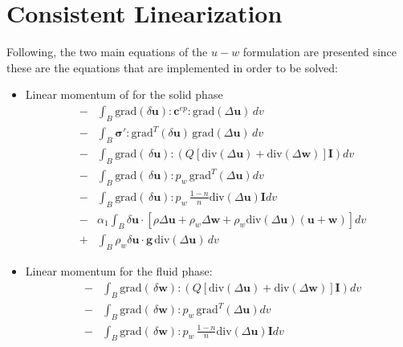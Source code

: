 \documentclass[preprint,12pt,a4paper]{elsarticle}
\begin{document}
\section{Consistent Linearization}
\label{ap:2}
Following, the two main equations of the $u-w$ formulation are presented since these are the equations that are implemented in order to be solved:

\begin{itemize}
\item Linear momentum of for the solid phase
\begin{eqnarray} \label{eq_r1}
&-& \int_B \mbox{grad}(\delta\boldsymbol{u}):\boldsymbol{c}^{ep}:\mbox{grad}(\Delta\boldsymbol{u}) \, dv 
\nonumber \\
&-& \int_B \boldsymbol{ \sigma'}:\mbox{grad}^T(\delta\boldsymbol{u} )\, \mbox{grad}(\Delta\boldsymbol{u}) \, dv 
\nonumber \\
&-& \int_B 
\mbox{grad}(\, \delta\boldsymbol{u}) :\left(Q\left[
\mbox{div}(\Delta\boldsymbol{ u})+
\mbox{div}(\Delta\boldsymbol{w}) \right] \boldsymbol{I}\right) dv
\nonumber \\
&-& \int_B 
\mbox{grad}(\, \delta\boldsymbol{u}) : p_w \, \mbox{grad}^T(\Delta\boldsymbol{u}) dv
\nonumber \\
&-& \int_B \mbox{grad}(\, \delta\boldsymbol{u}) : p_w \,\frac{1-n}{n}\mbox{div}(\Delta\boldsymbol{u})\boldsymbol{I} dv
\nonumber \\
&-& \alpha_1\int_B \delta\boldsymbol{u} \cdot \left[\rho \Delta\boldsymbol{u} + \rho_w \Delta\boldsymbol{w} + \rho_w \mbox{div}(\Delta\boldsymbol{u})\left(\boldsymbol{u}+\boldsymbol{w}\right)\right]  dv
\nonumber \\
&+& \int_B \rho_w \delta\boldsymbol{u} \cdot \boldsymbol{g} \, \mbox{div}(\Delta\boldsymbol{u})\, dv
\end{eqnarray}
\item Linear momentum for the fluid phase:
\begin{eqnarray} \label{eq_r2}
&-&\int_B 
\mbox{grad}(\, \delta\boldsymbol{w}) :\left(Q\left[
\mbox{div}(\Delta\boldsymbol{ u})+
\mbox{div}(\Delta\boldsymbol{w}) \right] \boldsymbol{I}\right) dv
\nonumber \\
&-& \int_B 
\mbox{grad}(\, \delta\boldsymbol{w}) : p_w \, \mbox{grad}^T(\Delta\boldsymbol{u}) dv
\nonumber \\
&-&\int_B \mbox{grad}(\, \delta\boldsymbol{w}) : p_w \,\frac{1-n}{n}\mbox{div}(\Delta\boldsymbol{u})\boldsymbol{I} dv

\end{eqnarray}
\end{itemize}
\end{document}
